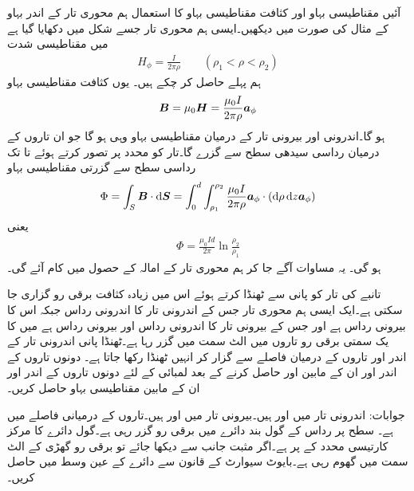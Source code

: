 آئیں مقناطیسی بہاو اور کثافت مقناطیسی بہاو کا استعمال ہم محوری تار کے اندر بہاو کے مثال کی صورت میں دیکھیں۔ایسی ہم محوری تار جسے شکل  میں دکھایا گیا ہے میں مقناطیسی شدت
\begin{align*}
H_{\phi}=\frac{I}{2\pi \rho} \quad \quad (\rho_1 < \rho < \rho_2)
\end{align*}
ہم پہلے حاصل کر چکے ہیں۔ یوں کثافت مقناطیسی بہاو
\begin{align*}
{\ensuremath{{\boldsymbol{B}}}}=\mu_0 {{\boldsymbol{H}}}=\frac{\mu_0 I}{2\pi \rho} {\boldsymbol{a}}_{\phi}
\end{align*}
ہو گا۔اندرونی اور بیرونی تار کے درمیان مقناطیسی بہاو وہی ہو گا جو ان تاروں کے درمیان رداسی سیدھی سطح سے گزرے گا۔تار کو  محدد پر تصور کرتے ہوئے  تا  تک رداسی سطح سے گزرتی مقناطیسی بہاو
\begin{align*}
\Phi=\int_S \kvec{B} \cdot \dif \kvec{S}=\int_{0}^{d} \int_{\rho_1}^{\rho_2} \frac{\mu_0 I}{2\pi \rho} \aphi \cdot (\dif \rho \dif z \aphi)
\end{align*}
یعنی
\begin{align}
\Phi=\frac{\mu_0 I d}{2\pi} \ln \frac{\rho_2}{\rho_1}
\end{align}
ہو گی۔ یہ مساوات آگے جا کر ہم محوری تار کے امالہ کے حصول میں کام آئے گی۔

تانبے کی تار کو پانی سے ٹھنڈا کرتے ہوئے اس میں زیادہ کثافت برقی رو گزاری جا سکتی ہے۔ایک ایسی ہم محوری تار جس کے اندرونی تار کا اندرونی رداس  جبکہ اس کا بیرونی رداس  ہے اور جس کے بیرونی تار کا اندرونی رداس  اور بیرونی رداس  ہے میں  کا یک سمتی برقی رو تاروں میں الٹ سمت میں گزر رہا ہے۔ٹھنڈا پانی اندرونی تار کے اندر اور تاروں کے درمیان فاصلے سے گزار کر انہیں ٹھنڈا رکھا جاتا ہے۔ دونوں تاروں کے اندر اور ان کے مابین  اور  حاصل کرنے کے بعد   لمبائی کے  لئے  دونوں تاروں کے اندر اور ان کے مابین  مقناطیسی بہاو حاصل کریں۔

جوابات: اندرونی تار میں  اور  ہیں۔بیرونی تار میں  اور  ہیں۔تاروں کے درمیانی فاصلے میں  ہے۔
 سطح پر  رداس کے گول بند دائرے میں  برقی رو گزر رہی ہے۔گول دائرے کا مرکز کارتیسی محدد کے  پر ہے۔اگر مثبت  جانب  سے دیکھا جائے تو برقی رو گھڑی کے الٹ سمت میں گھوم رہی ہے۔بایوٹ سیوارٹ کے قانون سے دائرے کے عین وسط میں  حاصل کریں۔

